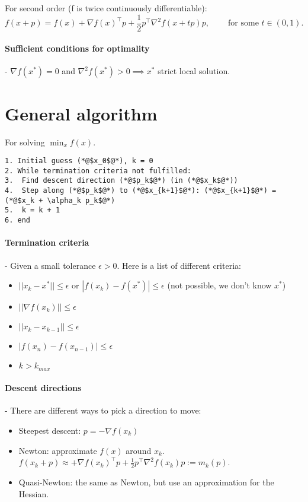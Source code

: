 \documentclass{article}
\begin{document}
For second order (f is twice continuously differentiable):
\[
  f(x+p) = f(x) + \nabla f(x)^{\top} p + \frac{1}{2}p^{\top} \nabla ^2 f(x+tp)p,\  \qquad\text{for some } t  \in (0, 1)
.\]

\paragraph{Sufficient conditions for optimality}- $\nabla f(x^*) = 0$ and $\nabla ^2 f(x^*) > 0 \implies x^*$ strict local solution. 

\section{General algorithm}

For solving $\min_{x} f(x)$.

\medskip
\lstset{basicstyle=\ttfamily}
\begin{lstlisting}
1. Initial guess (*@$x_0$@*), k = 0
2. While termination criteria not fulfilled:
3.  Find descent direction (*@$p_k$@*) (in (*@$x_k$@*))
4.  Step along (*@$p_k$@*) to (*@$x_{k+1}$@*): (*@$x_{k+1}$@*) = (*@$x_k + \alpha_k p_k$@*)
5.  k = k + 1
6. end  
\end{lstlisting}

\paragraph{Termination criteria}- Given a small tolerance $\epsilon > 0$. Here is a list of different criteria:
\begin{itemize}
  \item $||x_k - x^*|| \leq \epsilon$ or $|f(x_k) - f(x^*) | \leq \epsilon$ (not possible, we don't know $x^*$)
  \item $||\nabla f(x_k)|| \leq \epsilon$
  \item $||x_k - x_{k-1}|| \leq \epsilon$
  \item $|f(x_n) - f(x_{n-1})| \leq \epsilon$
  \item $k > k_{max}$
\end{itemize}

\paragraph{Descent directions}- There are different ways to pick a direction to move:
\begin{itemize}
  \item Steepest descent: $p = - \nabla f(x_k)$
  \item Newton: approximate $f(x)$ around $x_k$. $f(x_k+p) \approx + \nabla f(x_k)^{\top}p + \frac{1}{2}p^{\top}\nabla ^2 f(x_k)p := m_k(p)$.
  \item Quasi-Newton: the same as Newton, but use an approximation for the Hessian. 
\end{itemize} 
\end{document}
